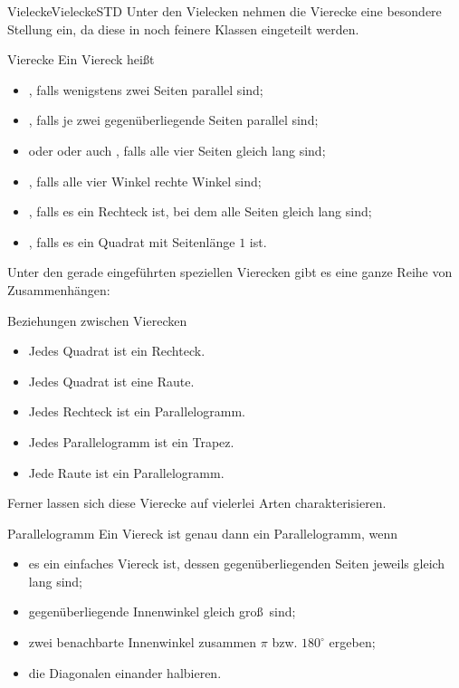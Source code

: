 \begin{MXContent}{Vielecke}{Vielecke}{STD}
Unter den Vielecken nehmen die Vierecke eine besondere Stellung ein, da diese in noch feinere Klassen eingeteilt werden.

\begin{MXInfo}{Vierecke}%
Ein Viereck hei\ss t
\begin{itemize}
 \item {}, falls wenigstens zwei Seiten parallel sind;
 \item {}, falls je zwei gegen\"uberliegende Seiten parallel sind;
 \item {} oder  oder auch , falls alle vier Seiten gleich lang sind;
 \item {}, falls alle vier Winkel rechte Winkel sind;
 \item {}, falls es ein Rechteck ist, bei dem alle Seiten gleich lang sind;
 \item {}, falls es ein Quadrat mit Seitenl\"ange $1$ ist.
\end{itemize}
\end{MXInfo}

Unter den gerade eingef\"uhrten speziellen Vierecken gibt es eine ganze Reihe von Zusammenh\"angen:

\begin{MXInfo}{Beziehungen zwischen Vierecken}%
\begin{itemize}
 \item Jedes Quadrat ist ein Rechteck.
\item Jedes Quadrat ist eine Raute.
\item Jedes Rechteck ist ein Parallelogramm.
\item Jedes Parallelogramm ist ein Trapez.
\item Jede Raute ist ein Parallelogramm.
\end{itemize}
\end{MXInfo}

Ferner lassen sich diese Vierecke auf vielerlei Arten charakterisieren.

\begin{MXInfo}{Parallelogramm}%
Ein Viereck ist genau dann ein Parallelogramm, wenn
\begin{itemize}
 \item es ein einfaches Viereck ist, dessen gegen\"uberliegenden Seiten jeweils gleich lang sind;
\item gegen\"uberliegende Innenwinkel gleich gro\ss\ sind;
\item zwei benachbarte Innenwinkel zusammen $\pi$ bzw. $180^\circ$ ergeben; 
\item die Diagonalen einander halbieren.
\end{itemize}
\end{MXInfo}



\end{MXContent}
